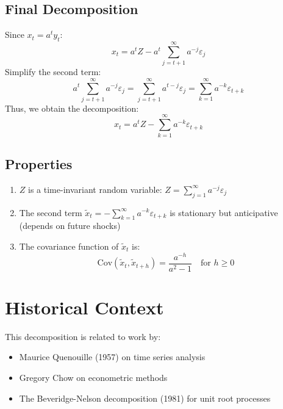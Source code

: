 \documentclass[12pt]{article}
\begin{document}
\subsection{Final Decomposition}
Since \( x_t = a^t y_t \):
\[
x_t = a^t Z - a^t \sum_{j=t+1}^{\infty} a^{-j} \varepsilon_j
\]
Simplify the second term:
\[
a^t \sum_{j=t+1}^{\infty} a^{-j} \varepsilon_j = \sum_{j=t+1}^{\infty} a^{t-j} \varepsilon_j = \sum_{k=1}^{\infty} a^{-k} \varepsilon_{t+k}
\]
Thus, we obtain the decomposition:
\begin{equation}
\boxed{x_t = a^t Z - \sum_{k=1}^{\infty} a^{-k} \varepsilon_{t+k}}
\end{equation}

\subsection{Properties}
\begin{enumerate}
    \item \( Z \) is a time-invariant random variable: \( Z = \sum_{j=1}^{\infty} a^{-j} \varepsilon_j \)
    \item The second term \( \tilde{x}_t = -\sum_{k=1}^{\infty} a^{-k} \varepsilon_{t+k} \) is stationary but anticipative (depends on future shocks)
    \item The covariance function of \( \tilde{x}_t \) is:
    \[
    \text{Cov}(\tilde{x}_t, \tilde{x}_{t+h}) = \frac{a^{-h}}{a^2 - 1} \quad \text{for } h \geq 0
    \]
\end{enumerate}

\section{Historical Context}
This decomposition is related to work by:
\begin{itemize}
    \item Maurice Quenouille (1957) on time series analysis
    \item Gregory Chow on econometric methods
    \item The Beveridge-Nelson decomposition (1981) for unit root processes
\end{itemize}
\end{document}
